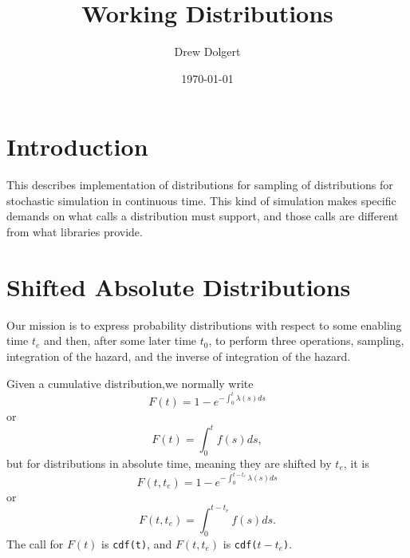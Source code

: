 \documentclass{article}
\title{Working Distributions}
\author{Drew Dolgert}
\date{\today}
\newcommand{\code}[1]{\texttt{#1}}
\begin{document}
\maketitle

\section{Introduction}
This describes implementation of distributions for sampling of
distributions for stochastic simulation in continuous time.
This kind of simulation makes specific demands on what calls
a distribution must support, and those calls are different from
what libraries provide.



\section{Shifted Absolute Distributions}
Our mission is to express probability distributions
with respect to some enabling time $t_e$ and then, after
some later time $t_0$, to perform three operations, sampling,
integration of the hazard, and the inverse of integration of
the hazard.

Given a cumulative distribution,we normally write
\begin{equation}
  F(t)=1-e^{-\int_{0}^t \lambda(s)ds}\label{eqn:simplecdf}
\end{equation}
or
\begin{equation}
  F(t)=\int_0^t f(s)ds,
\end{equation}
but for distributions in absolute time, meaning they are shifted
by $t_e$, it is
\begin{equation}
  F(t,t_e)=1-e^{-\int_{0}^{t-t_e} \lambda(s)ds}
\end{equation}
or
\begin{equation}
  F(t,t_e)=\int_{0}^{t-t_e} f(s)ds.
\end{equation}
The call for $F(t)$ is \code{cdf(t)}, and $F(t,t_e)$ is \code{cdf($t-t_e$)}.
\end{document}

